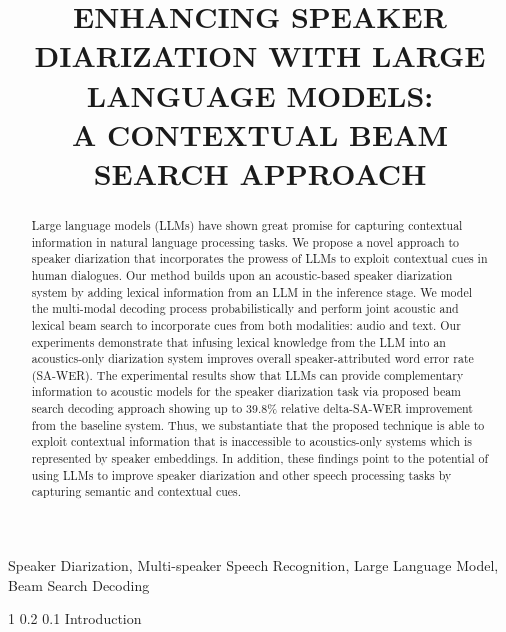 \documentclass{article}
\title{ENHANCING SPEAKER DIARIZATION WITH LARGE LANGUAGE MODELS:\\A CONTEXTUAL BEAM SEARCH APPROACH}
\makeatletter
\renewcommand{\section}{\@startsection
  {section}%
  {1}%
  {}%
  {0.2\baselineskip}%
  {0.1\baselineskip}%
  {}
}%
\makeatother
\begin{document}
\ninept

\setlength{\abovedisplayskip}{6pt}
\setlength{\belowdisplayskip}{6pt}

\maketitle
\begin{abstract}
Large language models (LLMs) have shown great promise for capturing contextual information in natural language processing tasks. We propose a novel approach to speaker diarization that incorporates the prowess of LLMs to exploit contextual cues in human dialogues. Our method builds upon an acoustic-based speaker diarization system by adding lexical information from an LLM in the inference stage. We model the multi-modal decoding process probabilistically and perform joint acoustic and lexical beam search to incorporate cues from both modalities: audio and text. Our experiments demonstrate that infusing lexical knowledge from the LLM into an acoustics-only diarization system improves overall speaker-attributed word error rate (SA-WER). The experimental results show that LLMs can provide complementary information to acoustic models for the speaker diarization task via proposed beam search decoding approach showing up to 39.8\% relative  delta-SA-WER improvement from the baseline system. Thus, we substantiate that the proposed technique is able to exploit contextual information that is inaccessible to acoustics-only systems which is represented by speaker embeddings. In addition, these findings point to the potential of using LLMs to improve speaker diarization and other speech processing tasks by capturing semantic and contextual cues.
\end{abstract}
%
\begin{keywords}
Speaker Diarization, Multi-speaker Speech Recognition, Large Language Model, Beam Search Decoding
\end{keywords}
%
\section{Introduction}
\label{sec:intro}
\end{document}
